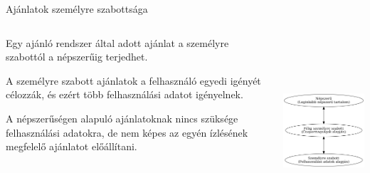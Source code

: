 \documentclass[english, aspectratio=169]{beamer}
\begin{document}
\begin{frame}{Ajánlatok személyre szabottsága}
\begin{columns}
\begin{column}{.5\textwidth}
Egy ajánló rendszer által adott ajánlat a személyre szabottól a népszerűig terjedhet.\par\medskip
A személyre szabott ajánlatok a felhasználó egyedi igényét célozzák, és ezért több felhasználási adatot igényelnek.\par\medskip
A népszerűségen alapuló ajánlatoknak nincs szüksége felhasználási adatokra, de nem képes az egyén ízlésének megfelelő ajánlatot előállítani.
\end{column}
\begin{column}{.5\textwidth}
\begin{center}
\includegraphics[width=7cm, height=7cm, keepaspectratio]{graphs/recommender_2.png}
\end{center}
\end{column}
\end{columns}
\end{frame}
\end{document}
